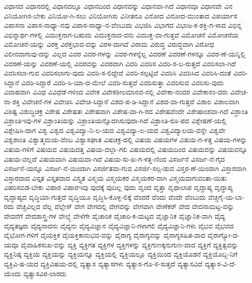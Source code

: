 {ವಿಧಾನದ
ವಿಧಾನದಲ್ಲಿ
ವಿಧಾನದಲ್ಲೂ
ವಿಧಾನದಿಂದ
ವಿಧಾನವನ್ನು
ವಿಧಾನವಾ-ಗಿದೆ
ವಿಧಾನವೂ
ವಿಧಾನವೇ
ವಿನ
ವಿನಿಯೋಗಿಸ-ಬೇಕು
ವಿನಿಯೋ-ಗಿ-ಸಲು
ವಿನಿಯೋಗಿಸು
ವಿನೀತನೂ
ವಿನೋದ
ವಿನೋದ-ಮುಂತಾದ
ವಿಪರ್ಯಾಸ
ವಿಪಾಸನಾ
ವಿಪಾಸ-ನಾಧ್ಯಾ-ನವು
ವಿಪಾಸ-ನಾಧ್ಯಾ-ನ-ವೆಂಬುದು
ವಿಭಜಿಸಿ
ವಿಭಾಗದ
ವಿಭಾಜ-ಕ-ಶಕ್ತಿ-ಗ-ಳಾದ
ವಿಭಿನ್ನ
ವಿಭಿನ್ನಾರ್ಥ-ಗಳಲ್ಲಿ
ವಿಮುಕ್ತನಾಗ-ಬಹುದು
ವಿಮುಕ್ತನಾದ-ವನು
ವಿಮುಕ್ತ-ವಾ-ಗುತ್ತವೆ
ವಿಮೋಚನೆ
ವಿಮೋಚನೆಯ
ವಿಮೋಚನೆ-ಯನ್ನು
ವಿರಕ್ತ
ವಿರಕ್ತಭಾವ-ವನ್ನು
ವಿರಳ-ವಾಗಿವೆ
ವಿರಾಮ
ವಿರುದ್ಧ
ವಿರುದ್ಧವಾಗಿ
ವಿರೋಧ
ವಿಲೀನವಾಗುವು-ದನ್ನು
ವಿಲ್ಲದ
ವಿವರ
ವಿವರ-ಗಳನ್ನು
ವಿವರ-ಗಳನ್ನೆಲ್ಲ
ವಿವರಣೆ
ವಿವರಣೆ-ಗಳನ್ನೂ
ವಿವರ-ಣೆ-ಯನ್ನಿಲ್ಲಿ
ವಿವರಣೆ-ಯನ್ನು
ವಿವರಣೆ-ಯಲ್ಲಿ
ವಿವರವನ್ನು
ವಿವರವಾಗಿ
ವಿವರಿ
ವಿವರಿಸ
ವಿವರಿ-ಸ-ಬ-ರುತ್ತದೆ
ವಿವರಿಸಲಾ-ಗಿದೆ
ವಿವರಿಸಲಾ-ಗುವ
ವಿವರಿಸಲಾಗು-ವುದು
ವಿವರಿ-ಸ-ಲಿದ್ದೇವೆ
ವಿವರಿ-ಸಲ್ಪಟ್ಟಿವೆ
ವಿವರಿಸಿ
ವಿವರಿಸಿದ
ವಿವರಿಸಿ-ದಂತೆ
ವಿವರಿ-ಸಿದ್ದಾನೆ
ವಿವರಿ-ಸಿದ್ದಾರೆ
ವಿವರಿ-ಸಿ-ಯಾ-ದ-ಮೇಲೆ
ವಿವರಿ-ಸುತ್ತದೆ
ವಿವರಿಸುತ್ತಾ
ವಿವರಿಸುವ
ವಿವರಿಸು-ವುದು
ವಿವಾಹವಾಗಿ
ವಿವಿಧ
ವಿವಿಧೆಡೆ-ಗಳಿಂದ
ವಿವೇಕ
ವಿವೇಕಶೀಲಮಾನವ-ನಲ್ಲಿ
ವಿವೇಕಾ-ನಂದರ
ವಿವೇಕಾನಂ-ದರು
ವಿವೇಚ-ನಾ-ಶಕ್ತಿ
ವಿವೇಚನೆ-ಗಳ
ವಿವೇಚಿಸಿ
ವಿವೇಚಿ-ಸಿದ್ದಾನೆ
ವಿಶದ-ಪ-ಡಿ-ಸಿದ್ದಾನೆ
ವಿಶದ-ವಾ-ಗುತ್ತದೆ
ವಿಶಾಲ
ವಿಶಾಲವಾಗಿ
ವಿಶಿಷ್ಟ
ವಿಶುದ್ಧಿಚಕ್ರ
ವಿಶೇಷ
ವಿಶೇಷತಃ
ವಿಶೇಷವಾಗಿ
ವಿಶೇಷ-ವಾ-ಗಿ-ರದ
ವಿಶೇಷವೆಂದೇ
ವಿಶೇಷಾಂಶವಾ-ಗಿದೆ
ವಿಶ್ರಾಂತಿ
ವಿಶ್ರಾಂತಿಇವು-ಗಳ
ವಿಶ್ರಾಂತಿಯನ್ನು
ವಿಶ್ರಾಂತಿಯನ್ನೊದಗಿಸುವುದಾ-ಗಿದೆ
ವಿಶ್ರಾಂತಿ-ರೂ-ಪದ
ವಿಶ್ಲೇಷಣೆ-ಯಲ್ಲಿ
ವಿಶ್ಲೇಷಿಸಿ-ದಾಗ
ವಿಶ್ವ
ವಿಶ್ವದ
ವಿಶ್ವವಿದ್ಯಾ-ನಿ-ಲ-ಯದ
ವಿಶ್ವವಿದ್ಯಾ-ಲ-ಯದ
ವಿಶ್ವವಿದ್ಯಾಲಯ-ವನ್ನೇ
ವಿಶ್ವವೇ
ವಿಶ್ವಶಾಂತಿ
ವಿಶ್ವಾತ್ಮಮಯ-ವೆಂಬ
ವಿಶ್ವಾಸಘಾತ
ವಿಷಚಕ್ರ-ದಲ್ಲಿ
ವಿಷಯ
ವಿಷಯಗಳ
ವಿಷಯ-ಗ-ಳತ್ತ
ವಿಷಯ-ಗಳನ್ನು
ವಿಷಯ-ಗಳಿಗೆ
ವಿಷಯದ
ವಿಷಯದತ್ತ
ವಿಷಯ-ದಲ್ಲಾ-ಗಲಿ
ವಿಷಯದಲ್ಲಿ
ವಿಷಯದಿಂದ
ವಿಷಯವನ್ನು
ವಿಷಯವನ್ನೂ
ವಿಷಯ-ವಲ್ಲದೆ
ವಿಷಯವಾಗಿ
ವಿಷಯವಾ-ಗಿದೆ
ವಿಷಯ-ಸು-ಖ-ಗ-ಳತ್ತ-ಣಿಂದ
ವಿಸರ್ಜನೆ
ವಿಸರ್ಜ-ನೆ-ಗೈದ
ವಿಸರ್ಜನೆ-ಯನ್ನೂ
ವಿಸರ್ಜ-ನೆ-ಯಿಂದಾಗಿ
ವಿಸರ್ಜಿತವಾ-ಗುವ
ವಿಸರ್ಜಿ-ಸಲ್ಪ-ಡುವ
ವಿಸ್ತರ-ಣೆ-ಯಿಂದಾಗಿ
ವಿಸ್ತಾರವಾಗಿ
ವಿಸ್ತಾರವಾದ
ವಿಸ್ತೃತ
ವಿಸ್ತೃತವಾದ
ವಿಸ್ತ್ಯತ
ವಿಸ್ಮಯ
ವಿಸ್ಮಯಕರ
ವಿಸ್ಮಯಕರ-ವಾಗಿ
ವಿಸ್ಮಯವಾಗುವಂತಾ-ಯಿತು
ವಿಹರಿಸಬಿಡ-ಬೇಕು
ವಿಹಾರ
ವಿಹಾರಇವು
ವುದಕ್ಕೆ
ವುದಿಲ್ಲ
ವುದು
ವೃಂದ
ವೃತ್ತಾ
ವೃಥಾಲಾಪ
ವೃದ್ದಾಪ್ಯ
ವೃದ್ಧಾಪ್ಯ
ವೃದ್ಧಾಪ್ಯದ
ವೃದ್ಧಿಯಾ-ಗುತ್ತದೆ
ವೃದ್ಧಿಯೂ
ವೃದ್ಧಿಸಿ-ಕೊಳ್ಳ-ಲಿಕ್ಕೆ
ವೆಂದರೆ
ವೆಂದು
ವೆಂದೇ
ವೆಂಬುದು
ವೆಚ್ಚಗೈ-ಯ-ಬಾ-ರದು
ವೆಚ್ಚವಿಲ್ಲದ
ವೆಲ್ಲ
ವೆಲ್ಲೇಸ್
ವೇಗ
ವೇಗದಲ್ಲಿ
ವೇಗವನ್ನು
ವೇಗವಾಗಿ
ವೇಣೆಕರ್
ವೇದ
ವೇದನಾಮಟ್ಟ-ವನ್ನು
ವೇದನೆಗೆ
ವೇದಶಾಸ್ತ್ರ-ಗಳ
ವೇಲ್ಸ್ಗೆ
ವೇಳೆಗೇ
ವೈಚಾರಿಕ
ವೈಚಾರಿ-ಕ-ಮಟ್ಟದ
ವೈಜ್ಞಾನಿಕ
ವೈಜ್ಞಾನಿಕ-ವಾಗಿ
ವೈದ್ಯ
ವೈದ್ಯತಜ್ಞರು
ವೈದ್ಯನಾದನು
ವೈದ್ಯನು
ವೈದ್ಯವಿಜ್ಞಾನ
ವೈದ್ಯವಿಜ್ಞಾನಿ-ಗಳಾಗಲಿ
ವೈದ್ಯವಿಜ್ಞಾನಿ-ಗಳು
ವೈಭವ
ವೈಭವದ
ವೈಭೋಗ-ಗಳಿಗೆ
ವೈಯಕ್ತಿಕ
ವೈಯಕ್ತಿಕಾನುಭವ-ವನ್ನು
ವೈರಾಗ್ಯ
ವೈರಾಗ್ಯವನ್ನು
ವೈರಾಗ್ಯಸಹಿತ-ವಾದ
ವೈರಾಗ್ಯೋ-ದ-ಯವೂ
ವೈವಾಹಿಕಸುಖ-ವನ್ನು
ವ್ಯಕ್ತಿ
ವ್ಯಕ್ತಿಗತ
ವ್ಯಕ್ತಿಗಳ
ವ್ಯಕ್ತಿಗಳನ್ನು
ವ್ಯಕ್ತಿಗುಣಕ್ಕನುಗುಣ-ವಾದ
ವ್ಯಕ್ತಿಗೆ
ವ್ಯಕ್ತಿತ್ವವನ್ನು
ವ್ಯಕ್ತಿನಿಷ್ಠ
ವ್ಯಕ್ತಿಯ
ವ್ಯಕ್ತಿಯನ್ನು
ವ್ಯಕ್ತಿಯನ್ನೂ
ವ್ಯಕ್ತಿಯಲ್ಲಿ
ವ್ಯಕ್ತಿಯಲ್ಲೂ
ವ್ಯಕ್ತಿಯಿಂದ
ವ್ಯಕ್ತಿಯೊಡನೆ
ವ್ಯಕ್ತಿಯೊಬ್ಬ-ನಿಗೆ
ವ್ಯಕ್ತಿವಿ-ಷ-ಯದ
ವ್ಯಕ್ತಿವಿಷಯ-ದಲ್ಲಿ
ವ್ಯತ್ಯಾಸ
ವ್ಯತ್ಯಾಸಗಳು
ವ್ಯತ್ಯಾಸ-ಗೊ-ಳಿ-ಸುತ್ತದೆ
ವ್ಯತ್ಯಾಸವಿದೆ
ವ್ಯತ್ಯಾಸ-ವಿ-ದೆ-ಯೆಂದು
ವ್ಯತ್ಯಾಸವಿರ-ಲಾರದು
}
